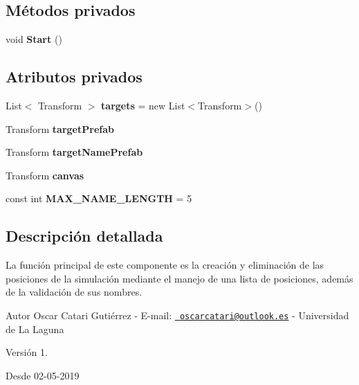 \subsection*{Métodos privados}
\begin{DoxyCompactItemize}
\item 
\mbox{\label{class_target_control_a09f09132c80cd12fd5c906e0f850eb54}} 
void {\bfseries Start} ()
\end{DoxyCompactItemize}
\subsection*{Atributos privados}
\begin{DoxyCompactItemize}
\item 
\mbox{\label{class_target_control_a20cca6a9d26773a2d4c88ce7a4444987}} 
List$<$ Transform $>$ {\bfseries targets} = new List$<$Transform$>$()
\item 
\mbox{\label{class_target_control_af4ca7f8b6c427b5998fb5d8d1c7d6fc2}} 
Transform {\bfseries target\+Prefab}
\item 
\mbox{\label{class_target_control_a32f92471c5e814892a1b4dabe8646428}} 
Transform {\bfseries target\+Name\+Prefab}
\item 
\mbox{\label{class_target_control_a0320767601ec3c1d87a5a4e72bc41bb1}} 
Transform {\bfseries canvas}
\item 
\mbox{\label{class_target_control_a9abf081f2fa828d749d84e0f158c9480}} 
const int {\bfseries M\+A\+X\+\_\+\+N\+A\+M\+E\+\_\+\+L\+E\+N\+G\+TH} = 5
\end{DoxyCompactItemize}


\subsection{Descripción detallada}
La función principal de este componente es la creación y eliminación de las posiciones de la simulación mediante el manejo de una lista de posiciones, además de la validación de sus nombres. \begin{DoxyAuthor}{Autor}
Oscar Catari Gutiérrez -\/ E-\/mail\+: \href{mailto:oscarcatari@outlook.es}{\texttt{ oscarcatari@outlook.\+es}} -\/ Universidad de La Laguna 
\end{DoxyAuthor}
\begin{DoxyVersion}{Versión}
1. 
\end{DoxyVersion}
\begin{DoxySince}{Desde}
02-\/05-\/2019 
\end{DoxySince}


